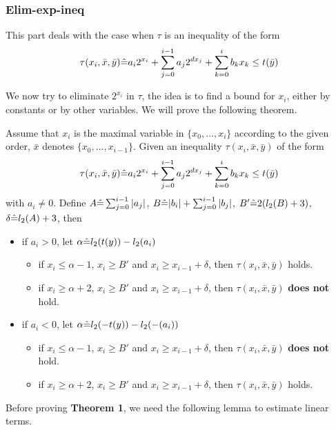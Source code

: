 \subsubsection{Elim-exp-ineq}

This part deals with the case when $\tau$ is an inequality of the form 
$$\tau(x_i,\bar{x},\bar{y}) \hat{=}  a_i 2^{x_i}+\sum_{j=0}^{i-1} a_j2^{d x_j} + \sum_{k=0}^{i}b_k x_k \le t(\bar{y})$$

We now try to eliminate $2^{x_i}$ in $\tau$, the idea is to find a bound for $x_i$, 
either by constants or by other variables.
We will prove the following theorem.

\begin{theorem} \label{thm:exp-ineq}
Assume that $x_i$ is the maximal variable in $\{x_0,...,x_{i}\}$ according to the given order, $\bar{x}$ denotes $\{x_0,...,x_{i-1}\}$.
Given an inequality $\tau(x_i,\bar{x},\bar{y})$ of the form  
$$\tau(x_i,\bar{x},\bar{y}) \hat{=}  a_i 2^{x_i}+\sum_{j=0}^{i-1} a_j2^{d x_j} + \sum_{k=0}^{i}b_k x_k \le t(\bar{y})$$
with $a_i \neq 0$. Define $A\hat{=} \sum_{j=0}^{i-1}|a_j|$, 
$B\hat{=} |b_i| + \sum_{j=0}^{i-1}|b_j|$, 
$B'\hat{=} 2(l_2(B)+3)$,
$\delta\hat{=}  l_2(A)+3$, then 
\begin{itemize}
    \item if $a_i > 0$, let $\alpha \hat{=} l_2(t(y))-l_2(a_i)$
    \begin{itemize}
        \item if $x_i \le \alpha -1$, $x_i \ge B'$ and $x_{i} \ge x_{i-1} +\delta $, then $\tau(x_i,\bar{x},\bar{y})$ holds.
        \item if $x_i \ge \alpha +2$, $x_i \ge B'$ and $x_{i} \ge x_{i-1} +\delta $, then $\tau(x_i,\bar{x},\bar{y})$ \textbf{does not} hold.
    \end{itemize}
    \item if $a_i < 0$, let $\alpha \hat{=} l_2(-t(y))-l_2(-(a_i))$
    \begin{itemize}
        \item if $x_i \le \alpha -1$, $x_i \ge B'$ and $x_{i} \ge x_{i-1} +\delta $, then $\tau(x_i,\bar{x},\bar{y})$ \textbf{does not} hold.
        \item if $x_i \ge \alpha +2$, $x_i \ge B'$ and $x_{i} \ge x_{i-1} +\delta $, then $\tau(x_i,\bar{x},\bar{y})$ holds.
    \end{itemize}
\end{itemize}
\end{theorem}

Before proving \textbf{Theorem 1}, we need  the following lemma to estimate linear terms.

